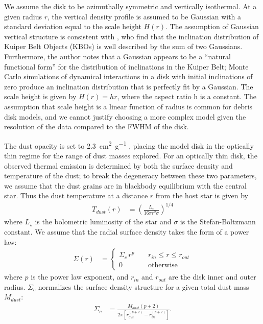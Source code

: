 \documentclass[modern]{aastex62}
\begin{document}
We assume the disk to be azimuthally symmetric and vertically isothermal. 
At a given radius $r$, the vertical density profile is assumed to be Gaussian with a standard deviation equal to the scale height $H(r)$.
The assumption of Gaussian vertical structure is consistent with \cite{brown01}, who find that the inclination distribution of Kuiper Belt Objects (KBOs) is well described by the sum of two Gaussians.
Furthermore, the author notes that a Gaussian appears to be a ``natural functional form'' for the distribution of inclinations in the Kuiper Belt; Monte Carlo simulations of dynamical interactions in a disk with initial inclinations of zero produce an inclination distribution that is perfectly fit by a Gaussian.
The scale height is given by $H(r) = hr$, where the aspect ratio h is a constant.
The assumption that scale height is a linear function of radius is common for debris disk models, and we cannot justify choosing a more complex model given the resolution of the data compared to the FWHM of the disk.

The dust opacity is set to \SI{2.3}{\cm^2.\gram^{-1}} \citep{beckwith90}, placing the model disk in the optically thin regime for the range of dust masses explored.
For an optically thin disk, the observed thermal emission is determined by both the surface density and temperature of the dust; to break the degeneracy between these two parameters, we assume that the dust grains are in blackbody equilibrium with the central star.
Thus the dust temperature at a distance $r$ from the host star is given by
\begin{align}
  T_{dust} (r) &= \left( \frac{L_{\star}}{16 \pi r^2 \sigma} \right)^{1/4}
\end{align}
where $L_{\star}$ is the bolometric luminosity of the star and $\sigma$ is the Stefan-Boltzmann constant. We assume that the radial surface density takes the form of a power law: 
\begin{align}
  \Sigma(r) &= 
  \begin{cases}
    \Sigma_c \, r^{p} \; \; \; \; & r_{in} \leq r \leq r_{out} \\
    0 \; \; \; \; &\mbox{otherwise} 
  \end{cases}
\end{align}
where $p$ is the power law exponent, and $r_{in}$ and $r_{out}$ are the disk inner and outer radius. 
$\Sigma_c$ normalizes the surface density structure for a given total dust mass $M_{dust}$:
\begin{align}
\Sigma_c &= \frac{M_{dust} \left(p + 2 \right)}{2 \pi \left[ r_{out}^{(p+2)} - r_{in}^{(p+2)} \right]}.
\end{align}
\end{document}
